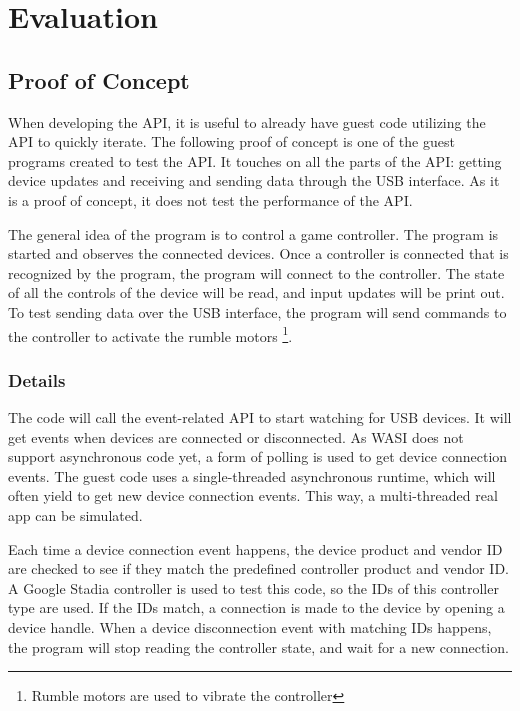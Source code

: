 \chapter{Evaluation}

\section{Proof of Concept}
When developing the API, it is useful to already have guest code utilizing the API to quickly iterate. The following proof of concept is one of the guest programs created to test the API. It touches on all the parts of the API: getting device updates and receiving and sending data through the USB interface. As it is a proof of concept, it does not test the performance of the API.

The general idea of the program is to control a game controller. The program is started and observes the connected devices. Once a controller is connected that is recognized by the program, the program will connect to the controller. The state of all the controls of the device will be read, and input updates will be print out. To test sending data over the USB interface, the program will send commands to the controller to activate the rumble motors \footnote{Rumble motors are used to vibrate the controller}.

\subsection{Details}
The code will call the event-related API to start watching for USB devices. It will get events when devices are connected or disconnected. As WASI does not support asynchronous code yet, a form of polling is used to get device connection events. The guest code uses a single-threaded asynchronous runtime, which will often yield to get new device connection events. This way, a multi-threaded real app can be simulated.

Each time a device connection event happens, the device product and vendor ID are checked to see if they match the predefined controller product and vendor ID. A Google Stadia controller is used to test this code, so the IDs of this controller type are used. If the IDs match, a connection is made to the device by opening a device handle. When a device disconnection event with matching IDs happens, the program will stop reading the controller state, and wait for a new connection.

